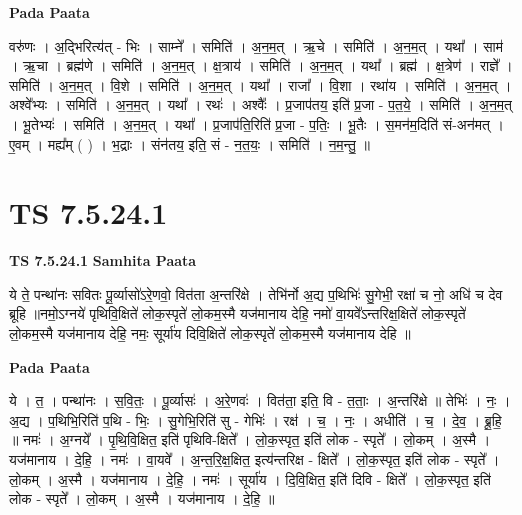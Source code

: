 \documentclass[17pt]{extarticle}
\begin{document}
\textbf{Pada Paata} \newline

वरु॑णः । अ॒द्भिरित्य॑त् - भिः । साम्ने᳚ । समिति॑ । अ॒न॒म॒त् । ऋ॒चे । समिति॑ । अ॒न॒म॒त् । यथा᳚ । साम॑ । ऋ॒चा । ब्रह्म॑णे । समिति॑ । अ॒न॒म॒त् । क्ष॒त्राय॑ । समिति॑ । अ॒न॒म॒त् । यथा᳚ । ब्रह्म॑ । क्ष॒त्रेण॑ । राज्ञे᳚ । समिति॑ । अ॒न॒म॒त् । वि॒शे । समिति॑ । अ॒न॒म॒त् । यथा᳚ । राजा᳚ । वि॒शा । रथा॑य । समिति॑ । अ॒न॒म॒त् । अश्वे᳚भ्यः । समिति॑ । अ॒न॒म॒त् । यथा᳚ । रथः॑ । अश्वैः᳚ । प्र॒जाप॑तय॒ इति॑ प्र॒जा - प॒त॒ये॒ । समिति॑ । अ॒न॒म॒त् । भू॒तेभ्यः॑ । समिति॑ । अ॒न॒म॒त् । यथा᳚ । प्र॒जाप॑ति॒रिति॑ प्र॒जा - प॒तिः॒ । भू॒तैः । स॒मन॑म॒दिति॑ सं-अन॑मत् । ए॒वम् । मह्य᳚म् ( ) । भ॒द्राः । संन॑तय॒ इति॒ सं - न॒त॒यः॒ । समिति॑ । न॒म॒न्तु॒ ॥  \newline





\section{ TS 7.5.24.1 }

\textbf{TS 7.5.24.1 } \newline
\textbf{Samhita Paata} \newline

ये ते॒ पन्था॑नः सवितः पू॒र्व्यासो॑ऽरे॒णवो॒ वित॑ता अ॒न्तरि॑क्षे । तेभि॑र्नो अ॒द्य प॒थिभिः॑ सु॒गेभी॒ रक्षा॑ च नो॒ अधि॑ च देव ब्रूहि ॥नमो॒ऽग्नये॑ पृथिवि॒क्षिते॑ लोक॒स्पृते॑ लो॒कम॒स्मै यज॑मानाय देहि॒ नमो॑ वा॒यवे᳚ऽन्तरिक्ष॒क्षिते॑ लोक॒स्पृते॑ लो॒कम॒स्मै यज॑मानाय देहि॒ नमः॒ सूर्या॑य दिवि॒क्षिते॑ लोक॒स्पृते॑ लो॒कम॒स्मै यज॑मानाय देहि ॥ \newline

\textbf{Pada Paata} \newline

ये । त॒ । पन्था॑नः । स॒वि॒तः॒ । पू॒र्व्यासः॑ । अ॒रे॒णवः॑ । वित॑ता॒ इति॒ वि - त॒ताः॒ । अ॒न्तरि॑क्षे ॥ तेभिः॑ । नः॒ । अ॒द्य । प॒थिभि॒रिति॑ प॒थि - भिः॒ । सु॒गेभि॒रिति॑ सु - गेभिः॑ । रक्ष॑ । च॒ । नः॒ । अधीति॑ । च॒ । दे॒व॒ । ब्रू॒हि॒ ॥ नमः॑ । अ॒ग्नये᳚ । पृ॒थि॒वि॒क्षित॒ इति॑ पृथिवि-क्षिते᳚ । लो॒क॒स्पृत॒ इति॑ लोक - स्पृते᳚ । लो॒कम् । अ॒स्मै । यज॑मानाय । दे॒हि॒ । नमः॑ । वा॒यवे᳚ । अ॒न्त॒रि॒क्ष॒क्षित॒ इत्य॑न्तरिक्ष - क्षिते᳚ । लो॒क॒स्पृत॒ इति॑ लोक - स्पृते᳚ । लो॒कम् । अ॒स्मै । यज॑मानाय । दे॒हि॒ । नमः॑ । सूर्या॑य । दि॒वि॒क्षित॒ इति॑ दिवि - क्षिते᳚ । लो॒क॒स्पृत॒ इति॑ लोक - स्पृते᳚ । लो॒कम् । अ॒स्मै । यज॑मानाय । दे॒हि॒ ॥  \newline
\end{document}
